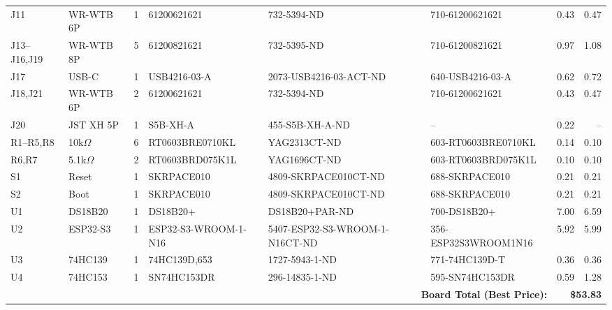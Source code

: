 {\begin{longtable}{@{}llrlp{2.8cm}p{2.5cm}rr@{}}
J11 & WR-WTB 6P & 1 & 61200621621 & 732-5394-ND & 710-61200621621 & 0.43 & 0.47 \\
J13--J16,J19 & WR-WTB 8P & 5 & 61200821621 & 732-5395-ND & 710-61200821621 & 0.97 & 1.08 \\
J17 & USB-C & 1 & USB4216-03-A & 2073-USB4216-03-ACT-ND & 640-USB4216-03-A & 0.62 & 0.72 \\
J18,J21 & WR-WTB 6P & 2 & 61200621621 & 732-5394-ND & 710-61200621621 & 0.43 & 0.47 \\
J20 & JST XH 5P & 1 & S5B-XH-A & 455-S5B-XH-A-ND & -- & 0.22 & -- \\
R1--R5,R8 & 10k$\Omega$ & 6 & RT0603BRE0710KL & YAG2313CT-ND & 603-RT0603BRE0710KL & 0.14 & 0.10 \\
R6,R7 & 5.1k$\Omega$ & 2 & RT0603BRD075K1L & YAG1696CT-ND & 603-RT0603BRD075K1L & 0.10 & 0.10 \\
S1 & Reset & 1 & SKRPACE010 & 4809-SKRPACE010CT-ND & 688-SKRPACE010 & 0.21 & 0.21 \\
S2 & Boot & 1 & SKRPACE010 & 4809-SKRPACE010CT-ND & 688-SKRPACE010 & 0.21 & 0.21 \\
U1 & DS18B20 & 1 & DS18B20+ & DS18B20+PAR-ND & 700-DS18B20+ & 7.00 & 6.59 \\
U2 & ESP32-S3 & 1 & ESP32-S3-WROOM-1-N16 & 5407-ESP32-S3-WROOM-1-N16CT-ND & 356-ESP32S3WROOM1N16 & 5.92 & 5.99 \\
U3 & 74HC139 & 1 & 74HC139D,653 & 1727-5943-1-ND & 771-74HC139D-T & 0.36 & 0.36 \\
U4 & 74HC153 & 1 & SN74HC153DR & 296-14835-1-ND & 595-SN74HC153DR & 0.59 & 1.28 \\
\midrule
\multicolumn{6}{r}{\textbf{Board Total (Best Price):}} & \multicolumn{2}{r}{\textbf{\$53.83}} \\
\end{longtable}

}
